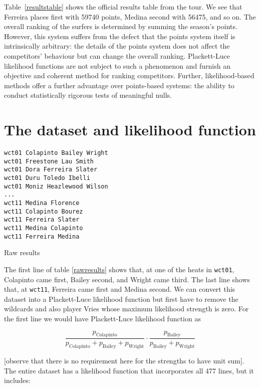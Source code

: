 \documentclass{article}
\begin{document}
Table~\ref{resultstable} shows the official results table from the
tour.  We see that Ferreira places first with 59740 points, Medina
second with 56475, and so on.  The overall ranking of the surfers is
determined by summing the season's points.  However, this system
suffers from the defect that the points system itself is intrinsically
arbitrary: the details of the points system does not affect the
competitors' behaviour but can change the overall ranking.
Plackett-Luce likelihood functions are not subject to such a
phenomenon and furnish an objective and coherent method for ranking
competitors.  Further, likelihood-based methods offer a further
advantage over points-based systems: the ability to conduct
statistically rigorous tests of meaningful nulls.  

\section{The dataset and likelihood function}

\begin{table}
\begin{verbatim}
wct01 Colapinto Bailey Wright
wct01 Freestone Lau Smith
wct01 Dora Ferreira Slater
wct01 Duru Toledo Ibelli
wct01 Moniz Heazlewood Wilson
...
wct11 Medina Florence
wct11 Colapinto Bourez
wct11 Ferreira Slater
wct11 Medina Colapinto
wct11 Ferreira Medina
\end{verbatim}
\caption{Raw results\label{rawresults}}
\end{table}

The first line of table \ref{rawresults} shows that, at one of the
heats in {\tt wct01}, Colapinto came first, Bailey second, and Wright
came third.  The last line shows that, at {\tt wct11}, Ferreira came
first and Medina second.  We can convert this dataset into a
Plackett-Luce likelihood function but first have to remove the
wildcards and also player Vries whose maximum likelihood strength is
zero.  For the first line we would have Plackett-Luce likelihood function as

\begin{equation}
\frac{p_\mathrm{Colapinto}}{p_\mathrm{Colapinto} + p_\mathrm{Bailey} + p_\mathrm{Wright}}\cdot
\frac{p_\mathrm{Bailey}}{p_\mathrm{Bailey} + p_\mathrm{Wright}}
\end{equation}

[observe that there is no requirement here for the strengths to have
unit sum].  The entire dataset has a likelihood function that
incorporates all 477 lines, but it includes:
\end{document}
